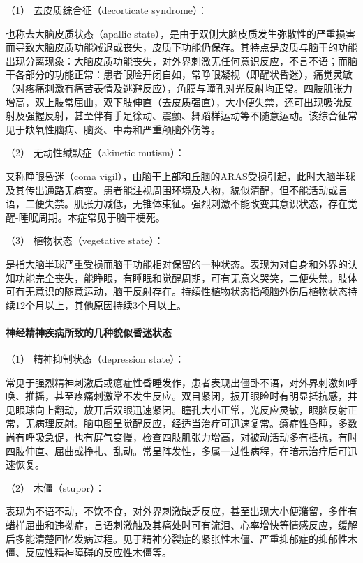 \hypertarget{text00010.htmlux5cux23CHP1-2-2-2-1-1}{}
（1） 去皮质综合征（decorticate syndrome）：

也称去大脑皮质状态（apallic
state），是由于双侧大脑皮质发生弥散性的严重损害而导致大脑皮质功能减退或丧失，皮质下功能仍保存。其特点是皮质与脑干的功能出现分离现象：大脑皮质功能丧失，对外界刺激无任何意识反应，不言不语；而脑干各部分的功能正常：患者眼睑开闭自如，常睁眼凝视（即醒状昏迷），痛觉灵敏（对疼痛刺激有痛苦表情及逃避反应），角膜与瞳孔对光反射均正常。四肢肌张力增高，双上肢常屈曲，双下肢伸直（去皮质强直），大小便失禁，还可出现吸吮反射及强握反射，甚至伴有手足徐动、震颤、舞蹈样运动等不随意运动。该综合征常见于缺氧性脑病、脑炎、中毒和严重颅脑外伤等。

\hypertarget{text00010.htmlux5cux23CHP1-2-2-2-1-2}{}
（2） 无动性缄默症（akinetic mutism）：

又称睁眼昏迷（coma
vigil），由脑干上部和丘脑的ARAS受损引起，此时大脑半球及其传出通路无病变。患者能注视周围环境及人物，貌似清醒，但不能活动或言语，二便失禁。肌张力减低，无锥体束征。强烈刺激不能改变其意识状态，存在觉醒-睡眠周期。本症常见于脑干梗死。

\hypertarget{text00010.htmlux5cux23CHP1-2-2-2-1-3}{}
（3） 植物状态（vegetative state）：

是指大脑半球严重受损而脑干功能相对保留的一种状态。表现为对自身和外界的认知功能完全丧失，能睁眼，有睡眠和觉醒周期，可有无意义哭笑，二便失禁。肢体可有无意识的随意运动，脑干反射存在。持续性植物状态指颅脑外伤后植物状态持续12个月以上，其他原因持续3个月以上。

\paragraph{神经精神疾病所致的几种貌似昏迷状态}

\hypertarget{text00010.htmlux5cux23CHP1-2-2-2-2-1}{}
（1） 精神抑制状态（depression state）：

常见于强烈精神刺激后或癔症性昏睡发作，患者表现出僵卧不语，对外界刺激如呼唤、推摇，甚至疼痛刺激常不发生反应。双目紧闭，扳开眼睑时有明显抵抗感，并见眼球向上翻动，放开后双眼迅速紧闭。瞳孔大小正常，光反应灵敏，眼脑反射正常，无病理反射。脑电图呈觉醒反应，经适当治疗可迅速复常。癔症性昏睡，多数尚有呼吸急促，也有屏气变慢，检查四肢肌张力增高，对被动活动多有抵抗，有时四肢伸直、屈曲或挣扎、乱动。常呈阵发性，多属一过性病程，在暗示治疗后可迅速恢复。

\hypertarget{text00010.htmlux5cux23CHP1-2-2-2-2-2}{}
（2） 木僵（stupor）：

表现为不语不动，不饮不食，对外界刺激缺乏反应，甚至出现大小便潴留，多伴有蜡样屈曲和违拗症，言语刺激触及其痛处时可有流泪、心率增快等情感反应，缓解后多能清楚回忆发病过程。见于精神分裂症的紧张性木僵、严重抑郁症的抑郁性木僵、反应性精神障碍的反应性木僵等。

